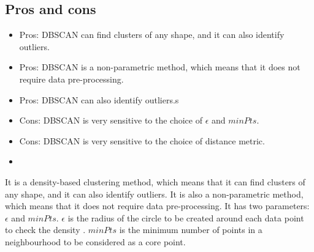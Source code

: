 \documentclass[12pt,a4paper]{article}
\begin{document}
\subsection{Pros and cons}
\begin{itemize}
    \item Pros: DBSCAN can find clusters of any shape, and it can also identify outliers.
    \item Pros: DBSCAN is a non-parametric method, which means that it does not require data pre-processing.
    \item Pros: DBSCAN can also identify outliers.s
    \item Cons: DBSCAN is very sensitive to the choice of $\epsilon$ and $minPts$.
    \item Cons: DBSCAN is very sensitive to the choice of distance metric.
    \item 
\end{itemize}
It is a density-based clustering method, which means that it can find clusters of any shape, and it can also identify outliers. It is also a non-parametric method, which means that it does not require data pre-processing.
It has two parameters: $\epsilon$ and $minPts$. $\epsilon$ is the radius of the circle to be created around each data point to check the density . $minPts$ is the minimum number of points in a neighbourhood to be considered as a core point.
\end{document}
